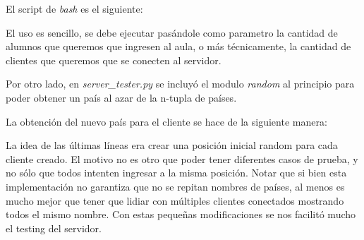 El script de \emph{bash} es el siguiente:


 
 El uso es sencillo, se debe ejecutar pas\'andole como parametro la cantidad de alumnos que queremos que ingresen al aula, o m\'as t\'ecnicamente, la cantidad de clientes que queremos que se conecten al servidor.
 
Por otro lado, en \emph{server\_tester.py} se incluy\'o el modulo \emph{random} al principio para poder obtener un pa\'is al azar de la n-tupla de pa\'ises.
  


La obtenci\'on del nuevo pa\'is para el cliente se hace de la siguiente manera:


La idea de las \'ultimas l\'ineas era crear una posici\'on inicial random para cada cliente creado. El motivo no es otro que poder tener diferentes casos de prueba, y no s\'olo que todos intenten ingresar a la misma posici\'on. Notar que si bien esta implementaci\'on no garantiza que no se repitan nombres de pa\'ises, al menos es mucho mejor que tener que lidiar con m\'ultiples clientes conectados mostrando todos el mismo nombre. Con estas peque\~nas modificaciones se nos facilit\'o mucho el testing del servidor.

